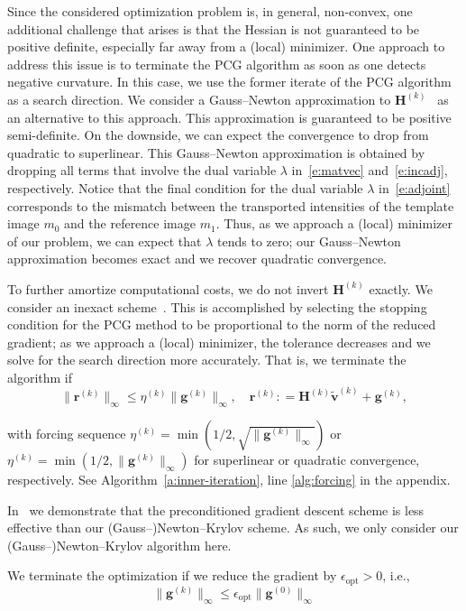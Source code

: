\documentclass[11pt]{amsart}
\newcommand{\algref}[1]{Algorithm~\ref{#1}}
\newcommand\di[1]{\ensuremath{\mathbf{#1}}}
\newcommand{\defeq}{\ensuremath{\mathrel{\mathop:}=}}
\begin{document}
Since the considered optimization problem is, in general, non-convex, one additional challenge that arises is that the Hessian is not guaranteed to be positive definite, especially far away from a (local) minimizer. One approach to address this issue is to terminate the PCG algorithm as soon as one detects negative curvature. In this case, we use the former iterate of the PCG algorithm as a search direction. We consider a Gauss--Newton approximation to $\di{H}^{(k)}$~\cite{Mang:2015a,Mang:2017a,Mang:2019a} as an alternative to this approach. This approximation is guaranteed to be positive semi-definite. On the downside, we can expect the convergence to drop from quadratic to superlinear. This Gauss--Newton approximation is obtained by dropping all terms that involve the dual variable $\lambda$ in~\eqref{e:matvec} and~\eqref{e:incadj}, respectively. Notice that the final condition for the dual variable $\lambda$ in~\eqref{e:adjoint} corresponds to the mismatch between the transported intensities of the template image $m_0$ and the reference image $m_1$. Thus, as we approach a (local) minimizer of our problem, we can expect that $\lambda$ tends to zero; our Gauss--Newton approximation becomes exact and we recover quadratic convergence.

To further amortize computational costs, we do not invert $\di{H}^{(k)}$ exactly. We consider an inexact scheme~\cite{Dembo:1983a,Eisenstat:1996a,Nocedal:2006a}. This is accomplished by selecting the stopping condition for the PCG method to be proportional to the norm of the reduced gradient; as we approach a (local) minimizer, the tolerance decreases and we solve for the search direction more accurately. That is, we terminate the algorithm if
\[
\|\di{r}^{(k)} \|_\infty \leq \eta^{(k)} \|\di{g}^{(k)}\|_\infty, \quad \di{r}^{(k)} \defeq \di{H}^{(k)} \di{\tilde{v}}^{(k)}  + \di{g}^{(k)},
\]

\noindent with forcing sequence $\eta^{(k)} = \min (1/2, \sqrt{\|\di{g}^{(k)}\|_\infty})$ or $\eta^{(k)} = \min (1/2, \|\di{g}^{(k)}\|_\infty)$ for superlinear or quadratic convergence, respectively. See \algref{a:inner-iteration}, line \ref{alg:forcing} in the appendix.

In~\cite{Mang:2015a} we demonstrate that the preconditioned gradient descent scheme is less effective than our (Gauss--)Newton--Krylov scheme. As such, we only consider our \mbox{(Gauss--)}Newton--Krylov algorithm here.


We terminate the optimization if we reduce the gradient by $\epsilon_{\text{opt}} > 0$, i.e.,
\[
\|\di{g}^{(k)}\|_{\infty} \leq \epsilon_{\text{opt}}\|\di{g}^{(0)}\|_{\infty}
\]
\end{document}
